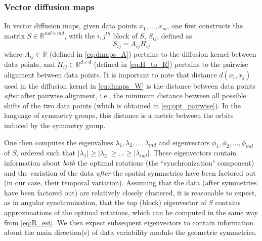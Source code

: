 \documentclass{pnastwo}
\begin{document}
\begin{article}
\subsubsection{Vector diffusion maps\cite{singer2012vector}}

In vector diffusion maps, given data points $x_1, \dots, x_m$, one first constructs the matrix $S \in \mathbb{R}^{md \times md}$, with the $i,j^{th}$ block of $S$, $S_{ij}$, defined as
\begin{equation} \label{eq:vdm_S}
	S_{ij} = A_{ij} H_{ij}
\end{equation}
%
where $A_{ij} \in \mathbb{R}$ (defined in \eqref{eq:dmaps_A}) pertains to the diffusion kernel between data points, and $H_{ij} \in \mathbb{R}^{d \times d}$ (defined in \eqref{eq:H_to_R}) pertains to the pairwise alignment between data points.
%
It is important to note that distance $d(x_i, x_j)$ used in the diffusion kernel in \eqref{eq:dmaps_W} is the distance between data points {\it after} after pairwise alignment, i.e., the minimum distance between all possible shifts of the two data points (which is obtained in \eqref{eq:opt_pairwise}).
%
In the language of symmetry groups, this distance is a metric between the orbits induced by the symmetry group.

One then computes the eigenvalues $\lambda_1, \lambda_2, \dots, \lambda_{md}$ and eigenvectors $\phi_1, \phi_2, \dots, \phi_{md}$ of $S$, ordered such that $|\lambda_1| \ge |\lambda_2| \ge \dots \ge |\lambda_{md}|$.
%
These eigenvectors contain information about {\it both} the optimal rotations (the ``synchronization" component) and the
variation of the data {\it after} the spatial symmetries have been factored out (in our case, their temporal variation).
%
Assuming that the data (after symmetries have been factored out) are relatively closely clustered, it is reasonable
to expect, as in angular synchronization, that the top (block) eigenvector of $S$ contains approximations of the optimal rotations,
which can be computed in the same way from \eqref{eq:R_est}.
%
We then expect subsequent eigenvectors to contain information about the main direction(s) of data variability modulo the geometric symmetries.
%


\end{article}
\end{document}
